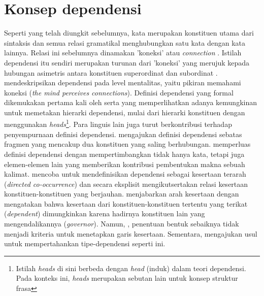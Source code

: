 \section{Konsep dependensi}
Seperti yang telah diungkit sebelumnya, kata merupakan konstituen utama dari sintaksis dan semua relasi gramatikal menghubungkan satu kata dengan kata lainnya. Relasi ini sebelumnya dinamakan 'koneksi' atau \textit{connection} \citep{tesniere1959elements}. Istilah dependensi itu sendiri merupakan turunan dari 'koneksi' yang merujuk kepada hubungan asimetris antara konstituen superordinat dan subordinat \citep{hudson1984word}. \cite{tesniere1959elements} mendeskripsikan dependensi pada level mentalitas, yaitu pikiran memahami koneksi (\textit{the mind perceives connections}). Definisi dependensi yang formal dikemukakan pertama kali oleh \cite{lecerf1960programme} serta \cite{gladkij1966lekcii} yang memperlihatkan adanya kemungkinan untuk memetakan hierarki dependensi, mulai dari hierarki konstituen dengan menggunakan \textit{heads}\footnote{Istilah \textit{heads} di sini berbeda dengan \textit{head} (induk) dalam teori dependensi. Pada konteks ini, \textit{heads} merupakan sebutan lain untuk konsep struktur frasa}. Para linguis lain juga turut berkontribusi terhadap penyempurnaan definisi dependensi. \cite{mel'vcuk1988dependency} mengajukan definisi dependensi sebatas fragmen yang mencakup dua konstituen yang saling berhubungan. \cite{garde1977ordre} memperluas definisi dependensi dengan mempertimbangkan tidak hanya kata, tetapi juga elemen-elemen lain yang memberikan kontribusi pembentukan makna sebuah kalimat. \cite{schubert1987metataxis} mencoba untuk mendefinisikan dependensi sebagai kesertaan terarah (\textit{directed co-occurrence}) dan secara eksplisit mengikutsertakan relasi kesertaan konstituen-konstituen yang berjauhan. \cite{schubert1987metataxis} menjabarkan arah kesertaan dengan mengatakan bahwa kesertaan dari konstituen-konstituen tertentu yang terikat (\textit{dependent}) dimungkinkan karena hadirnya konstituen lain yang mengendalikannya (\textit{governor}). Namun, \cite{schubert1987metataxis}, penentuan bentuk sebaiknya tidak menjadi kriteria untuk menetapkan garis kesertaan. Sementara, \cite{hudson1994discontinuous} mengajukan usul untuk mempertahankan \gls{tipe-dependensi} seperti ini.

